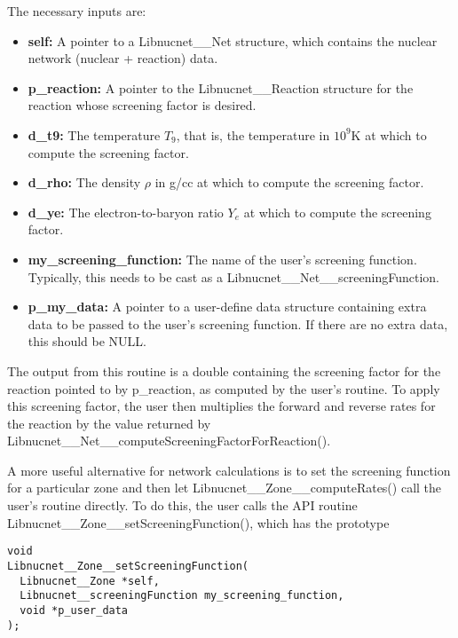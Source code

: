 \documentclass{article}    %
\begin{document}
The necessary inputs are:

\begin{itemize}

\item {\bf self:} A pointer to a Libnucnet\_\_Net structure, which contains
the nuclear network (nuclear + reaction) data.

\item {\bf p\_reaction:}  A pointer to the Libnucnet\_\_Reaction structure
for the reaction whose screening factor is desired.

\item {\bf d\_t9:} The temperature $T_9$, that is, the temperature
in $10^9$K at which to compute the screening factor.

\item {\bf d\_rho:} The density $\rho$ in g/cc at which to compute the screening
factor.

\item {\bf d\_ye:} The electron-to-baryon ratio $Y_e$ at which to compute the
screening factor.

\item {\bf my\_screening\_function:} The name of the user's screening function.
Typically, this needs to be cast as a Libnucnet\_\_Net\_\_screeningFunction.

\item {\bf p\_my\_data:}  A pointer to a user-define data structure containing
extra data to be passed to the user's screening function.  If there are
no extra data, this should be NULL.

\end{itemize}

The output from this routine is a double containing the screening factor
for the reaction pointed to by p\_reaction, as computed by the user's routine.
To apply this screening factor, the user then multiplies the forward and
reverse rates for the reaction by the value returned by
Libnucnet\_\_Net\_\_computeScreeningFactorForReaction().

A more useful alternative for network calculations
is to set the screening function for a particular zone and
then let Libnucnet\_\_Zone\_\_computeRates() call the user's routine
directly.  To do this, the user calls the API routine
Libnucnet\_\_Zone\_\_setScreeningFunction(), which has the prototype

\begin{verbatim}
void
Libnucnet__Zone__setScreeningFunction(
  Libnucnet__Zone *self,
  Libnucnet__screeningFunction my_screening_function,
  void *p_user_data
);
\end{verbatim}
\end{document}

